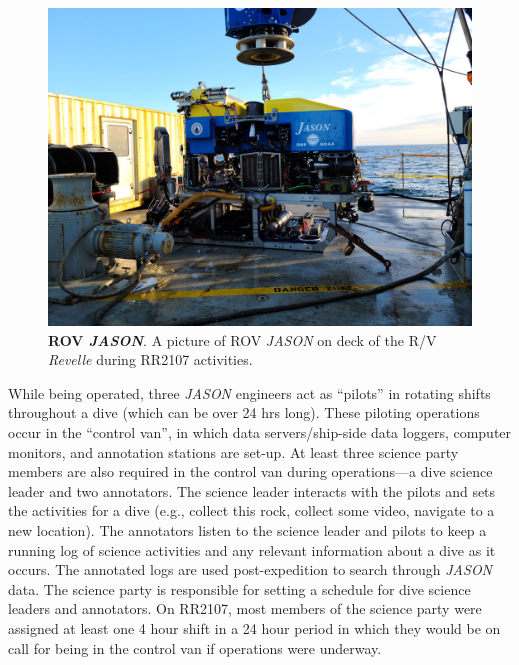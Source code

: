 \begin{figure}[h!]
  \centering
  \includegraphics[width=0.8\columnwidth]{figures/ops_jason.jpg}
  \caption[ROV \emph{JASON}]{\textbf{ROV \emph{JASON}}. A picture of ROV \emph{JASON} on deck of the R/V \emph{Revelle} during RR2107 activities.}
  \label{fig:ops_jason}
\end{figure}

While being operated, three \emph{JASON} engineers act as ``pilots'' in rotating shifts throughout a dive (which can be over 24 hrs long). These piloting operations occur in the ``control van'', in which data servers/ship-side data loggers, computer monitors, and annotation stations are set-up. At least three science party members are also required in the control van during operations---a dive science leader and two annotators. The science leader interacts with the pilots and sets the activities for a dive (e.g., collect this rock, collect some video, navigate to a new location). The annotators listen to the science leader and pilots to keep a running log of science activities and any relevant information about a dive as it occurs. The annotated logs are used post-expedition to search through \emph{JASON} data. The science party is responsible for setting a schedule for dive science leaders and annotators. On RR2107, most members of the science party were assigned at least one 4 hour shift in a 24 hour period in which they would be on call for being in the control van if operations were underway.

